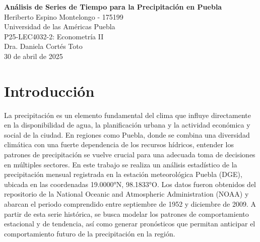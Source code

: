 \documentclass[12pt,letterpaper]{article}   %
\begin{document}
\begin{titlepage}
    \begin{center}
        \vspace*{2cm}
        \textbf{Análisis de Series de Tiempo para la Precipitación en Puebla}\\[2cm]

        Heriberto Espino Montelongo - 175199\\[0.5cm]
        Universidad de las Américas Puebla\\[0.5cm]
        P25-LEC4032-2: Econometría II\\[0.5cm]
        Dra. Daniela Cortés Toto\\[0.5cm]
        30 de abril de 2025\\
    \end{center}
    \vfill
\end{titlepage}




\setcounter{page}{1}
\tableofcontents
\newpage


\setcounter{page}{1}
\section{Introducción}
La precipitación es un elemento fundamental del clima que influye directamente en la disponibilidad de agua, la planificación urbana y la actividad económica y social de la ciudad. En regiones como Puebla, donde se combina una diversidad climática con una fuerte dependencia de los recursos hídricos, entender los patrones de precipitación se vuelve crucial para una adecuada toma de decisiones en múltiples sectores.
En este trabajo se realiza un análisis estadístico de la precipitación mensual registrada en la estación meteorológica Puebla (DGE), ubicada en las coordenadas 19.0000°N, 98.1833°O. Los datos fueron obtenidos del repositorio de la National Oceanic and Atmospheric Administration (NOAA) y abarcan el periodo comprendido entre septiembre de 1952 y diciembre de 2009. A partir de esta serie histórica, se busca modelar los patrones de comportamiento estacional y de tendencia, así como generar pronósticos que permitan anticipar el comportamiento futuro de la precipitación en la región.
\end{document}
